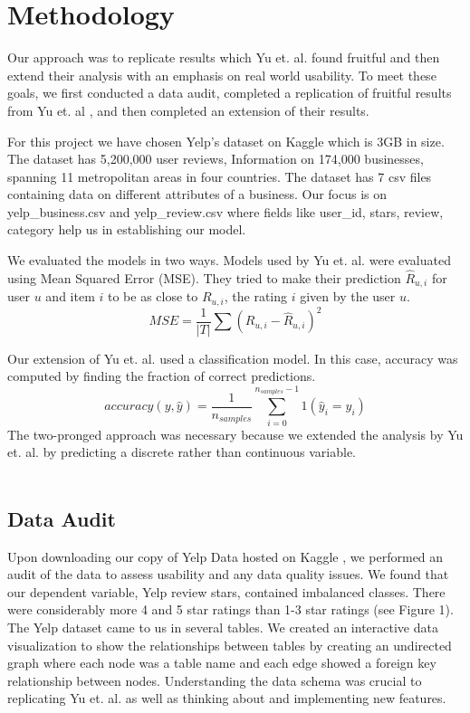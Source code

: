 \documentclass[12pt]{article}
\begin{document}
\section{Methodology}

Our approach was to replicate results which Yu et. al. \cite{yu2015restaurants} found
fruitful and then extend their analysis with an emphasis on real world usability. To meet
these goals, we first conducted a data audit, completed a replication of fruitful results
from Yu et. al \cite{yu2015restaurants}, and then completed an extension of their results.

For this project we have chosen Yelp’s dataset on Kaggle \cite{YelpData59:online}
which is 3GB in size. The dataset has 5,200,000 user reviews, Information on 174,000 businesses,
spanning 11 metropolitan areas in four countries. The dataset has 7 csv files containing data on
different attributes of a business. Our focus is on yelp\_business.csv and yelp\_review.csv where
fields like user\_id, stars, review, category help us in establishing our model.

We evaluated the models in two ways. Models used by Yu et. al. \cite{yu2015restaurants}
were evaluated using Mean Squared Error (MSE). They tried to make their prediction $\hat{R}_{u,i}$
for user $u$ and item $i$ to be as close to $R_{u,i}$, the rating $i$ given by the user $u$.
\[
MSE = \frac{1}{|T|}\sum(R_{u,i} - \hat{R}_{u,i})^2
\]

Our extension of Yu et. al. \cite{yu2015restaurants} used a classification model. In this
case, accuracy was computed by finding the fraction of correct predictions.
\[
accuracy(y, \hat{y}) = \frac{1}{n_{samples}} \sum_{i=0}^{n_{samples} - 1} 1(\hat{y}_i = y_i)
\]
The two-pronged approach was necessary because we extended the analysis by Yu et. al.
\cite{yu2015restaurants} by predicting a discrete rather than continuous variable.\\ \\

\subsection{Data Audit}

Upon downloading our copy of Yelp Data hosted on Kaggle \cite{YelpData59:online}, we performed
an audit of the data to assess usability and any data quality issues. We found that our
dependent variable, Yelp review stars, contained imbalanced classes. There were considerably
more 4 and 5 star ratings than 1-3 star ratings (see Figure 1). The Yelp dataset came to us in
several tables. We created an interactive data visualization to show the relationships between
tables by creating an undirected graph where each node was a table name and each edge showed a
foreign key relationship between nodes. Understanding the data schema was crucial to replicating
Yu et. al. \cite{yu2015restaurants} as well as thinking about and implementing new features.
\end{document}
